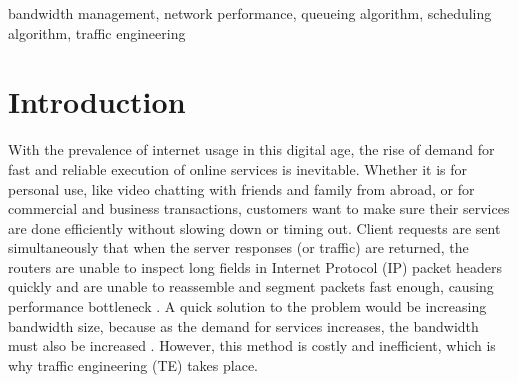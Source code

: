 \documentclass[journal]{IEEE/IEEEtran}
\title{\SPTITLE}
\author{\ADVISEE~and~\ADVISER%
\REMARK
}
\begin{document}
\maketitle

\begin{abstract}
Internet bandwidth is an expensive resource that is increasing in demand. As an alternative to meet those demands, UNQS was developed to simulate real traffic data and to help identify the optimal bandwidth setting, which can then minimize cost. Traffic data was collected using \textit{ntopng} and had a bandwidth of 3,448.96 Kbps, a total of 554,392 flows and 432,616,056 packets with a total size of 273,715,167,385 bytes over a span of 8 days. The data was processed using the FIFO scheduling algorithm with different bandwidth constraints and a TTL of 60 seconds. Results showed that increasing the bandwidth reduced the amount of unserviced flows until eventually, all flows are serviced and that a minimum recommended bandwidth can be determined by observing the shift in the trend of the results. In conclusion, UNQS can be used to find the optimal bandwidth setting for a network given existing traffic data.
\end{abstract}

\begin{keywords}
bandwidth management, network performance, queueing algorithm, scheduling algorithm, traffic engineering
\end{keywords}

\section{Introduction}
With the prevalence of internet usage in this digital age, the rise of demand for fast and reliable execution of online services is inevitable. Whether it is for personal use, like video chatting with friends and family from abroad, or for commercial and business transactions, customers want to make sure their services are done efficiently without slowing down or timing out. Client requests are sent simultaneously that when the server responses (or traffic) are returned, the routers are unable to inspect long fields in Internet Protocol (IP) packet headers quickly and are unable to reassemble and segment packets fast enough, causing performance bottleneck \cite{pazos_gerla_rigolio_1999}. A quick solution to the problem would be increasing bandwidth size, because as the demand for services increases, the bandwidth must also be increased \cite{communication_news_2001}. However, this method is costly and inefficient, which is why traffic engineering (TE) takes place. 
\end{document}
